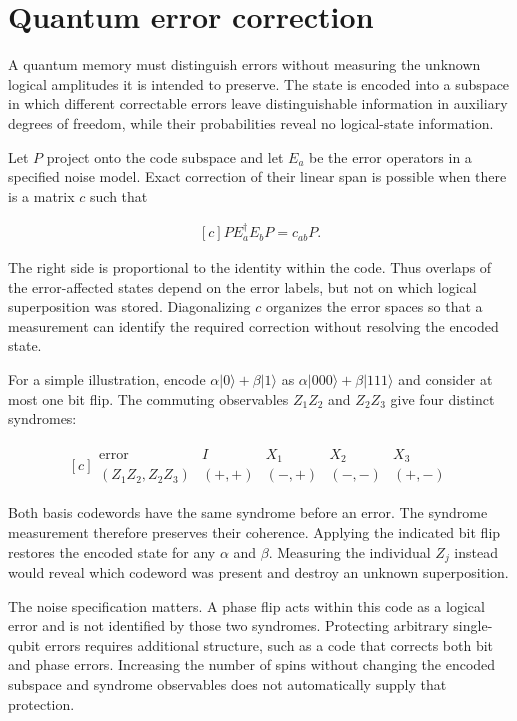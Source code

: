 \documentclass[11pt,oneside]{book}
\newenvironment{centeredalign}{\[\begin{gathered}[c]}{\end{gathered}\]}
\begin{document}
\clearpage

\section{Quantum error correction}

\label{topic:quantum-error-correction}

A quantum memory must distinguish errors without measuring the unknown logical amplitudes it is intended to preserve. The state is encoded into a subspace in which different correctable errors leave distinguishable information in auxiliary degrees of freedom, while their probabilities reveal no logical-state information.

Let \(P\) project onto the code subspace and let \(E_a\) be the error operators in a specified noise model. Exact correction of their linear span is possible when there is a matrix \(c\) such that

\begin{centeredalign}
P E_a^\dagger E_b P=c_{ab}P.
\end{centeredalign}

The right side is proportional to the identity within the code. Thus overlaps of the error-affected states depend on the error labels, but not on which logical superposition was stored. Diagonalizing \(c\) organizes the error spaces so that a measurement can identify the required correction without resolving the encoded state.

For a simple illustration, encode \(\alpha|0\rangle+\beta|1\rangle\) as \(\alpha|000\rangle+\beta|111\rangle\) and consider at most one bit flip. The commuting observables \(Z_1Z_2\) and \(Z_2Z_3\) give four distinct syndromes:

\begin{centeredalign}
\begin{array}{c|rrrr}
\text{error}&I&X_1&X_2&X_3\\\hline
(Z_1Z_2,Z_2Z_3)&(+,+)&(-,+)&(-,-)&(+,-)
\end{array}
\end{centeredalign}

Both basis codewords have the same syndrome before an error. The syndrome measurement therefore preserves their coherence. Applying the indicated bit flip restores the encoded state for any \(\alpha\) and \(\beta\). Measuring the individual \(Z_j\) instead would reveal which codeword was present and destroy an unknown superposition.

The noise specification matters. A phase flip acts within this code as a logical error and is not identified by those two syndromes. Protecting arbitrary single-qubit errors requires additional structure, such as a code that corrects both bit and phase errors. Increasing the number of spins without changing the encoded subspace and syndrome observables does not automatically supply that protection.
\end{document}
